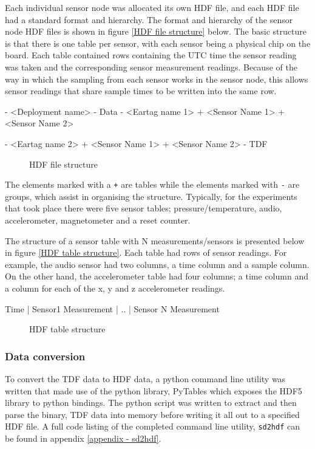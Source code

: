 Each individual sensor node was allocated its own HDF file, and each HDF file had a standard format and hierarchy. The format and hierarchy of the sensor node HDF files is shown in figure \ref{HDF file structure} below. The basic structure is that there is one table per sensor, with each sensor being a physical chip on the board. Each table contained rows containing the UTC time the sensor reading was taken and the corresponding sensor measurement readings. Because of the way in which the sampling from each sensor works in the sensor node, this allows sensor readings that share sample times to be written into the same row.  

\begin{verbbox}
  - <Deployment name> 
    - Data
        - <Eartag name 1>
            + <Sensor Name 1>
            + <Sensor Name 2>

        - <Eartag name 2>
            + <Sensor Name 1>
            + <Sensor Name 2>
    - TDF
\end{verbbox}
\begin{figure}[ht!]
  \centering
  \theverbbox
  \caption{HDF file structure}
\end{figure}

The elements marked with a \texttt{+} are tables while the elements marked with \texttt{-} are groups, which assist in organising the structure. Typically, for the experiments that took place there were five sensor tables; pressure/temperature, audio, accelerometer, magnetometer and a reset counter. 

The structure of a sensor table with N measurements/sensors is presented below in figure \ref{HDF table structure}. Each table had rows of sensor readings. For example, the audio sensor had two columns, a time column and a sample column. On the other hand, the accelerometer table had four columns; a time column and a column for each of the x, y and z accelerometer readings. \\

\begin{verbbox}
Time | Sensor1 Measurement | .. | Sensor N Measurement 
\end{verbbox}
\begin{figure}[ht!]
  \centering
  \theverbbox
  \caption{HDF table structure}
\end{figure}

\subsubsection{Data conversion}
To convert the TDF data to HDF data, a python command line utility was written that made use of the python library, PyTables which exposes the HDF5 library to python bindings. The python script was written to extract and then parse the binary, TDF data into memory before writing it all out to a specified HDF file. A full code listing of the completed command line utility, \texttt{sd2hdf} can be found in appendix \ref{appendix - sd2hdf}. 

